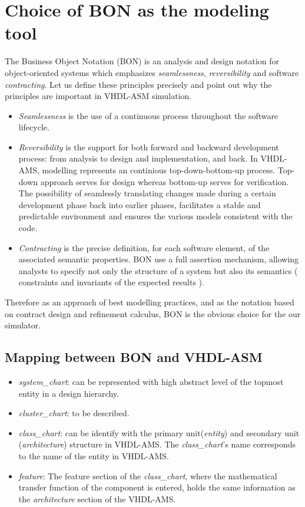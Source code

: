 \documentclass{article}
\newcommand{\todo}{\textbf{TODO:}}
\newcommand{\Sc}{\emph{system\_chart}\xspace}
\newcommand{\Clc}{\emph{cluster\_chart}\xspace}
\newcommand{\Csc}{\emph{class\_chart}\xspace}
\newcommand{\Ft}{\emph{feature}\xspace}
\newcommand{\ent}{\emph{entity}\xspace}
\newcommand{\arch}{\emph{architecture}\xspace}
\begin{document}
\section{Choice of BON as the modeling tool}
The Business Object Notation (BON) is an analysis and design notation 
for object-oriented systems  which emphasizes \emph{seamlessness}, 
\emph{reversibility} and software \emph{contracting}. Let us define 
these principles precisely and point out why the principles are 
important in VHDL-ASM simulation.
\begin{itemize}
\item \emph{Seamlessness} is the use of a continuous process 
throughout the software lifecycle.
\item \emph{Reversibility} is the support for both forward and 
backward development process: from analysis to design 
and implementation, and back.
In VHDL-AMS, modelling represents an continious top-down-bottom-up
process. Top-down approach serves for design whereas bottom-up
serves for verification. The possibility of seamlessly translating 
changes made during a certain development phase back into earlier phases,
facilitates a stable and predictable environment and ensures the various 
models consistent with the code.
\item \emph{Contracting} is the precise definition, for each software element, 
of the associated semantic properties. BON use a full assertion mechanism, 
allowing analysts to specify not only the structure of a system but also its
semantics ( constraints and invariants of the expected results ).
\end{itemize}

Therefore as an approach of best modelling practices, and as the notation 
based on contract design and refinement calculus, BON is the obvious choice 
for the our simulator.

\subsection{Mapping between BON and VHDL-ASM}
\begin{itemize}
\item \Sc: can be represented with high abstract level of the topmost 
entity in a design hierarchy.
\item \Clc: to be described.
\item \Csc: can be identify with the primary unit(\ent) and secondary 
unit (\arch) structure in VHDL-AMS.
The \Csc's name corresponds to the name of the entity in VHDL-AMS.
\item \Ft: The feature section of the \Csc, where the mathematical 
transfer function of the component is entered, holds the same information 
as the \arch section of the VHDL-AMS.
\end{itemize}
\end{document}
